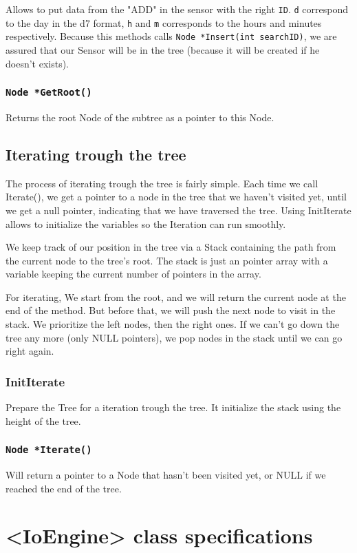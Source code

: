 \documentclass[10pt]{article}
\begin{document}
Allows to put data from the "ADD" in the sensor with the right \texttt{ID}. \texttt d correspond to the day in the d7 format, \texttt h and \texttt m corresponds to the hours and minutes respectively. Because this methods calls {\tt Node *Insert(int searchID)}, we are assured that our Sensor will be in the tree (because it will be created if he doesn't exists).

\subsubsection*{\tt Node *GetRoot()}
Returns the root Node of the subtree as a pointer to this Node.

\subsection{Iterating trough the tree}
The process of iterating trough the tree is fairly simple. Each time we call Iterate(), we get a pointer to a node in the tree that we haven’t visited yet, until we get a null pointer, indicating that we have traversed the tree. Using InitIterate allows to initialize the variables so the Iteration can run smoothly.

We keep track of our position in the tree via a Stack containing the path from the current node to the tree's root. The stack is just an pointer array with a variable keeping the current number of pointers in the array.

For iterating, We start from the root, and we will return the current node at the end of the method. But before that, we will push the next node to visit in the stack. We prioritize the left nodes, then the right ones. If we can't go down the tree any more (only NULL pointers), we pop nodes in the stack until we can go right again.

\subsubsection*{InitIterate}
Prepare the Tree for a iteration trough the tree. It initialize the stack using the height of the tree.

\subsubsection*{\tt Node *Iterate()}
Will return a pointer to a Node that hasn't been visited yet, or NULL if we reached the end of the tree.

\section{<IoEngine> class specifications}
\end{document}
